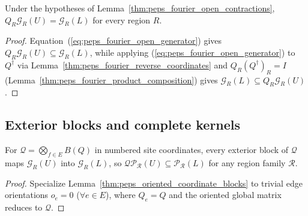 \begin{lemma}%
    \label{thm:peps_fourier_regional_ranges}
    \leanok
    Under the hypotheses of Lemma~\ref{thm:peps_fourier_open_contractions}, $Q_R\mathcal G_R(U)=\mathcal G_R(L)$ for every region $R$.
\end{lemma}
\begin{proof}\leanok
    Equation~(\ref{eq:peps_fourier_open_generator}) gives $Q_R\mathcal G_R(U)\subseteq\mathcal G_R(L)$, while applying (\ref{eq:peps_fourier_open_generator}) to $Q^\dagger$ via Lemma~\ref{thm:peps_fourier_reverse_coordinates} and $Q_R(Q^\dagger)_R=I$ (Lemma~\ref{thm:peps_fourier_product_composition}) gives $\mathcal G_R(L)\subseteq Q_R\mathcal G_R(U)$.
\end{proof}

\subsection{Exterior blocks and complete kernels}

\begin{lemma}%
    \label{thm:peps_fourier_exterior_blocks}
    \leanok
    For $\mathcal Q=\bigotimes_{f\in E}B(Q)$ in numbered site coordinates, every exterior block of $\mathcal Q$ maps $\mathcal G_R(U)$ into $\mathcal G_R(L)$, so $\mathcal Q\mathcal P_{\mathcal R}(U)\subseteq\mathcal P_{\mathcal R}(L)$ for any region family $\mathcal R$.
\end{lemma}
\begin{proof}\leanok
    Specialize Lemma~\ref{thm:peps_oriented_coordinate_blocks} to trivial edge orientations $o_e=0$ ($\forall e\in E$), where $Q_e=Q$ and the oriented global matrix reduces to $\mathcal Q$.
\end{proof}

